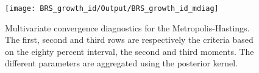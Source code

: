  
\begin{figure}[H]
\centering 
\texttt{[image: BRS\_growth\_id/Output/BRS\_growth\_id\_mdiag]}
\caption{Multivariate convergence diagnostics for the Metropolis-Hastings.
The first, second and third rows are respectively the criteria based on
the eighty percent interval, the second and third moments. The different 
parameters are aggregated using the posterior kernel.}\label{Fig:MultivariateDiagnostics}
\end{figure}


